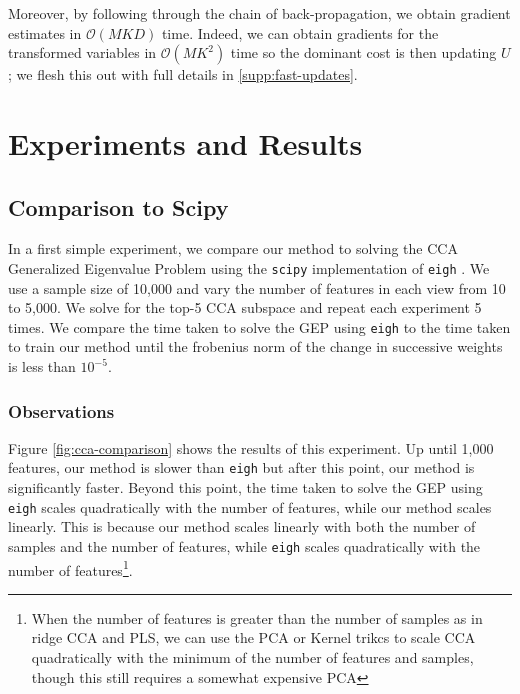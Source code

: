 Moreover, by following through the chain of back-propagation, we obtain gradient estimates in $\mathcal{O}(MKD)$ time.
Indeed, we can obtain gradients for the transformed variables in $\mathcal{O}(M K^2)$ time so the dominant cost is then updating $U$; we flesh this out with full details in \cref{supp:fast-updates}.

\section{Experiments and Results}

\subsection{Comparison to Scipy}
In a first simple experiment, we compare our method to solving the CCA Generalized Eigenvalue Problem using the \texttt{scipy} implementation of \texttt{eigh} \citep{virtanen2020scipy}.
We use a sample size of 10,000 and vary the number of features in each view from 10 to 5,000.
We solve for the top-5 CCA subspace and repeat each experiment 5 times.
We compare the time taken to solve the GEP using \texttt{eigh} to the time taken to train our method until the frobenius norm of the change in successive weights is less than $10^{-5}$.

\subsubsection{Observations}
Figure \ref{fig:cca-comparison} shows the results of this experiment.
Up until 1,000 features, our method is slower than \texttt{eigh} but after this point, our method is significantly faster.
Beyond this point, the time taken to solve the GEP using \texttt{eigh} scales quadratically with the number of features, while our method scales linearly.
This is because our method scales linearly with both the number of samples and the number of features, while \texttt{eigh} scales quadratically with the number of features\footnote{When the number of features is greater than the number of samples as in ridge CCA and PLS, we can use the PCA or Kernel trikcs to scale CCA quadratically with the minimum of the number of features and samples, though this still requires a somewhat expensive PCA}.

